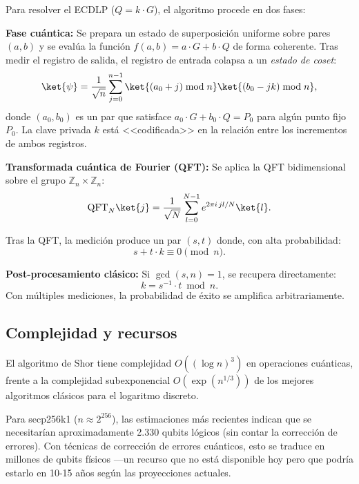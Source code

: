 Para resolver el ECDLP ($Q = k \cdot G$), el algoritmo procede en dos fases:

\textbf{Fase cuántica:} Se prepara un estado de superposición uniforme sobre pares $(a, b)$ y se evalúa la función $f(a, b) = a \cdot G + b \cdot Q$ de forma coherente. Tras medir el registro de salida, el registro de entrada colapsa a un \emph{estado de coset}:
\begin{equation}
  \ket{\psi} = \frac{1}{\sqrt{n}} \sum_{j=0}^{n-1} \ket{(a_0 + j) \bmod n} \ket{(b_0 - jk) \bmod n},
  \label{eq:coset_state}
\end{equation}
donde $(a_0, b_0)$ es un par que satisface $a_0 \cdot G + b_0 \cdot Q = P_0$ para algún punto fijo $P_0$. La clave privada $k$ está <<codificada>> en la relación entre los incrementos de ambos registros.

\textbf{Transformada cuántica de Fourier (QFT):} Se aplica la QFT bidimensional sobre el grupo $\mathbb{Z}_n \times \mathbb{Z}_n$:
\begin{equation}
  \text{QFT}_N \ket{j} = \frac{1}{\sqrt{N}} \sum_{l=0}^{N-1} e^{2\pi i \, jl / N} \ket{l}.
  \label{eq:qft}
\end{equation}

Tras la QFT, la medición produce un par $(s, t)$ donde, con alta probabilidad:
\begin{equation}
  s + t \cdot k \equiv 0 \pmod{n}.
  \label{eq:shor_relation}
\end{equation}

\textbf{Post-procesamiento clásico:} Si $\gcd(s, n) = 1$, se recupera directamente:
\begin{equation}
  k = s^{-1} \cdot t \bmod n.
  \label{eq:key_recovery}
\end{equation}
Con múltiples mediciones, la probabilidad de éxito se amplifica arbitrariamente.

\subsection{Complejidad y recursos}

El algoritmo de Shor tiene complejidad $O((\log n)^3)$ en operaciones cuánticas, frente a la complejidad subexponencial $O(\exp(n^{1/3}))$ de los mejores algoritmos clásicos para el logaritmo discreto.

Para secp256k1 ($n \approx 2^{256}$), las estimaciones más recientes \parencite{choosingcoordinates2025} indican que se necesitarían aproximadamente 2.330 qubits lógicos (sin contar la corrección de errores). Con técnicas de corrección de errores cuánticos, esto se traduce en millones de qubits físicos ---un recurso que no está disponible hoy pero que podría estarlo en 10-15 años según las proyecciones actuales.

